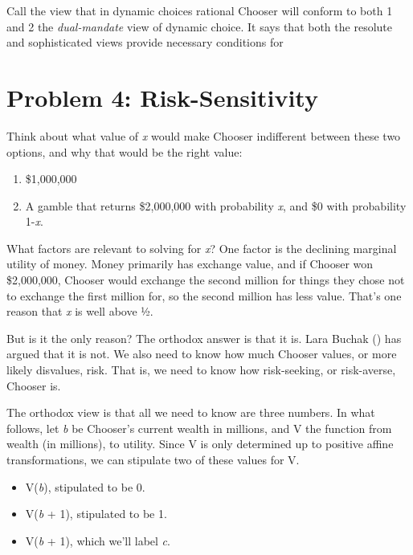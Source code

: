 \documentclass[
  10pt,
  letterpaper,
  DIV=11,
  numbers=noendperiod,
  twoside]{scrartcl}
\providecommand{\tightlist}{%
  \setlength{\itemsep}{0pt}\setlength{\parskip}{0pt}}\usepackage{longtable,booktabs,array}
\begin{document}
Call the view that in dynamic choices rational Chooser will conform to
both 1 and 2 the \emph{dual-mandate} view of dynamic choice. It says
that both the resolute and sophisticated views provide necessary
conditions for

\section{Problem 4: Risk-Sensitivity}\label{sec-buchak}

Think about what value of \emph{x} would make Chooser indifferent
between these two options, and why that would be the right value:

\begin{enumerate}
\def\labelenumi{\arabic{enumi}.}
\tightlist
\item
  \$1,000,000
\item
  A gamble that returns \$2,000,000 with probability \emph{x}, and \$0
  with probability 1-\emph{x}.
\end{enumerate}

What factors are relevant to solving for \emph{x}? One factor is the
declining marginal utility of money. Money primarily has exchange value,
and if Chooser won \$2,000,000, Chooser would exchange the second
million for things they chose not to exchange the first million for, so
the second million has less value. That's one reason that \emph{x} is
well above ½.

But is it the only reason? The orthodox answer is that it is. Lara
Buchak () has argued that it is not. We
also need to know how much Chooser values, or more likely disvalues,
risk. That is, we need to know how risk-seeking, or risk-averse, Chooser
is.

The orthodox view is that all we need to know are three numbers. In what
follows, let \emph{b} be Chooser's current wealth in millions, and V the
function from wealth (in millions), to utility. Since V is only
determined up to positive affine transformations, we can stipulate two
of these values for V.

\begin{itemize}
\tightlist
\item
  V(\emph{b}), stipulated to be 0.
\item
  V(\emph{b} + 1), stipulated to be 1.
\item
  V(\emph{b} + 1), which we'll label \emph{c}.
\end{itemize}
\end{document}
